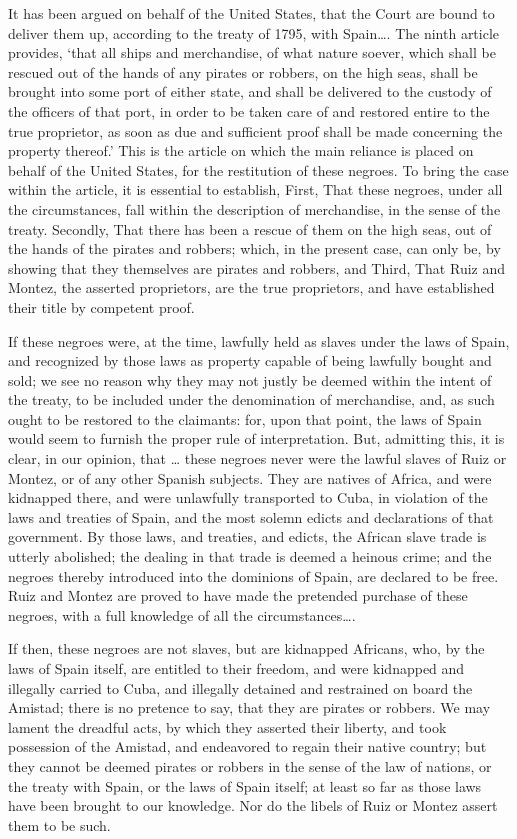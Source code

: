 It has been argued on behalf of the United States, that the Court are bound to
deliver them up, according to the treaty of 1795, with Spain{\dots}. The ninth
article provides, `that all ships and merchandise, of what nature soever, which
shall be rescued out of the hands of any pirates or robbers, on the high seas,
shall be brought into some port of either state, and shall be delivered to the
custody of the officers of that port, in order to be taken care of and restored
entire to the true proprietor, as soon as due and sufficient proof shall be
made concerning the property thereof.' This is the article on which the main
reliance is placed on behalf of the United States, for the restitution of these
negroes. To bring the case within the article, it is essential to establish,
First, That these negroes, under all the circumstances, fall within the
description of merchandise, in the sense of the treaty. Secondly, That there
has been a rescue of them on the high seas, out of the hands of the pirates and
robbers; which, in the present case, can only be, by showing that they
themselves are pirates and robbers, and Third, That Ruiz and Montez, the
asserted proprietors, are the true proprietors, and have established their
title by competent proof.

If these negroes were, at the time, lawfully held as slaves under the laws of
Spain, and recognized by those laws as property capable of being lawfully
bought and sold; we see no reason why they may not justly be deemed within the
intent of the treaty, to be included under the denomination of merchandise,
and, as such ought to be restored to the claimants: for, upon that point, the
laws of Spain would seem to furnish the proper rule of interpretation. But,
admitting this, it is clear, in our opinion, that {\dots} these negroes never
were the lawful slaves of Ruiz or Montez, or of any other Spanish subjects.
They are natives of Africa, and were kidnapped there, and were unlawfully
transported to Cuba, in violation of the laws and treaties of Spain, and the
most solemn edicts and declarations of that government. By those laws, and
treaties, and edicts, the African slave trade is utterly abolished; the dealing
in that trade is deemed a heinous crime; and the negroes thereby introduced
into the dominions of Spain, are declared to be free. Ruiz and Montez are
proved to have made the pretended purchase of these negroes, with a full
knowledge of all the circumstances{\dots}.

If then, these negroes are not slaves, but are kidnapped Africans, who, by the
laws of Spain itself, are entitled to their freedom, and were kidnapped and
illegally carried to Cuba, and illegally detained and restrained on board the
Amistad; there is no pretence to say, that they are pirates or robbers. We may
lament the dreadful acts, by which they asserted their liberty, and took
possession of the Amistad, and endeavored to regain their native country; but
they cannot be deemed pirates or robbers in the sense of the law of nations, or
the treaty with Spain, or the laws of Spain itself; at least so far as those
laws have been brought to our knowledge. Nor do the libels of Ruiz or Montez
assert them to be such.

